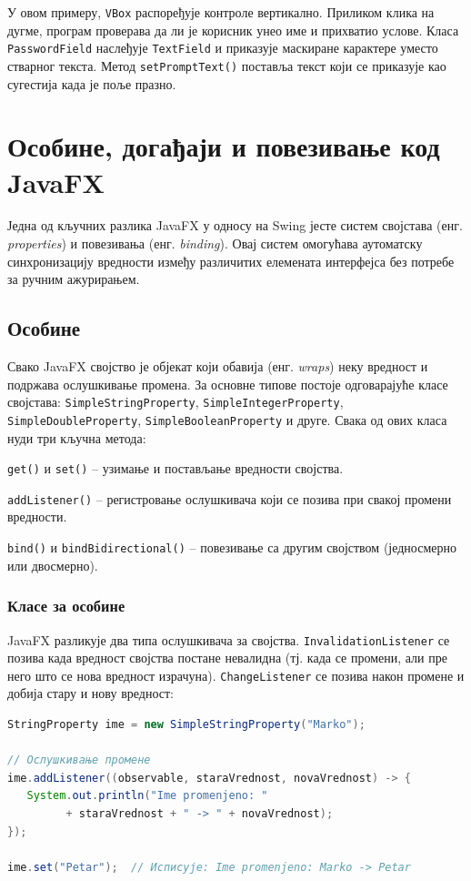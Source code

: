 У овом примеру, \texttt{VBox} распоређује контроле вертикално. Приликом клика на дугме, програм проверава да ли је корисник унео име и прихватио услове. Класа \texttt{PasswordField} наслеђује \texttt{TextField} и приказује маскиране карактере уместо стварног текста. Метод \texttt{setPromptText()} поставља текст који се приказује као сугестија када је поље празно.


\section{Особине, догађаји и повезивање код JavaFX}

Једна од кључних разлика JavaFX у односу на Swing јесте систем својстава (енг. \textit{properties}) и повезивања (енг. \textit{binding}). Овај систем омогућава аутоматску синхронизацију вредности између различитих елемената интерфејса без потребе за ручним ажурирањем.


\subsection{Особине}

Свако JavaFX својство је објекат који обавија (енг. \textit{wraps}) неку вредност и подржава ослушкивање промена. За основне типове постоје одговарајуће класе својстава: \texttt{SimpleStringProperty}, \texttt{SimpleIntegerProperty}, \texttt{SimpleDoubleProperty}, \texttt{SimpleBooleanProperty} и друге. Свака од ових класа нуди три кључна метода:

\texttt{get()} и \texttt{set()} – узимање и постављање вредности својства.

\texttt{addListener()} – регистровање ослушкивача који се позива при свакој промени вредности.

\texttt{bind()} и \texttt{bindBidirectional()} – повезивање са другим својством (једносмерно или двосмерно).

\subsubsection{Класе за особине}

JavaFX разликује два типа ослушкивача за својства. \texttt{InvalidationListener} се позива када вредност својства постане невалидна (тј. када се промени, али пре него што се нова вредност израчуна). \texttt{ChangeListener} се позива након промене и добија стару и нову вредност:


\begin{lstlisting}[language=Java]
StringProperty ime = new SimpleStringProperty("Marko");
 
// Ослушкивање промене
ime.addListener((observable, staraVrednost, novaVrednost) -> {
   System.out.println("Ime promenjeno: "
         + staraVrednost + " -> " + novaVrednost);
});
 
ime.set("Petar");  // Исписује: Ime promenjeno: Marko -> Petar
\end{lstlisting}



